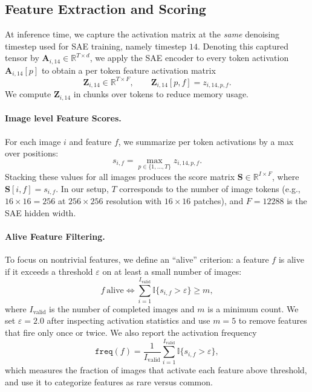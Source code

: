 \documentclass{article}
\begin{document}
\subsection{Feature Extraction and Scoring}

At inference time, we capture the activation matrix at the \emph{same} denoising timestep used for SAE training, namely timestep \(14\). Denoting this captured tensor by \(\mathbf{A}_{i,14} \in \mathbb{R}^{T\times d}\), we apply the SAE encoder to every token activation \(\mathbf{A}_{i,14}[p]\) to obtain a per token feature activation matrix
\begin{equation}
\mathbf{Z}_{i,14} \in \mathbb{R}^{T \times F}, \qquad \mathbf{Z}_{i,14}[p,f] = z_{i,14,p,f}.
\end{equation}
We compute \(\mathbf{Z}_{i,14}\) in chunks over tokens to reduce memory usage.

\paragraph{Image level Feature Scores.}
For each image \(i\) and feature \(f\), we summarize per token activations by a max over positions:
\begin{equation}
s_{i,f} = \max_{p \in \{1,\dots,T\}} z_{i,14,p,f}.
\end{equation}
Stacking these values for all images produces the score matrix \(\mathbf{S} \in \mathbb{R}^{I \times F}\), where \(\mathbf{S}[i,f] = s_{i,f}\). In our setup, \(T\) corresponds to the number of image tokens (e.g., \(16\times 16=256\) at \(256\times 256\) resolution with \(16\times 16\) patches), and \(F=12288\) is the SAE hidden width.

\paragraph{Alive Feature Filtering.}
To focus on nontrivial features, we define an ``alive'' criterion: a feature \(f\) is alive if it exceeds a threshold \(\varepsilon\) on at least a small number of images:
\begin{equation}
f\ \text{alive} \iff \sum_{i=1}^{I_{\mathrm{valid}}} \mathbb{I}\{s_{i,f} > \varepsilon\} \ge m,
\end{equation}
where \(I_{\mathrm{valid}}\) is the number of completed images and \(m\) is a minimum count. We set \(\varepsilon = 2.0\) after inspecting activation statistics and use \(m=5\) to remove features that fire only once or twice. We also report the activation frequency
\begin{equation}
\texttt{freq}(f) = \frac{1}{I_{\mathrm{valid}}}\sum_{i=1}^{I_{\mathrm{valid}}} \mathbb{I}\{s_{i,f} > \varepsilon\},
\end{equation}
which measures the fraction of images that activate each feature above threshold, and use it to categorize features as rare versus common.
\end{document}
